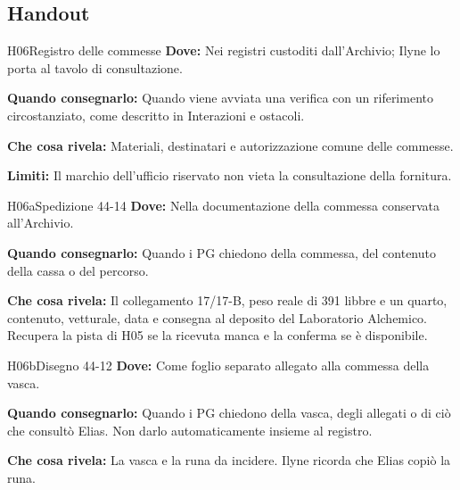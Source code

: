 \documentclass[11pt,a4paper]{article}
\begin{document}
\subsection{Handout}
\label{nodo-3-handout}
{}
\begin{handoutbox}{H06}{Registro delle commesse}
\textbf{Dove:} Nei registri custoditi dall'Archivio; Ilyne lo porta al tavolo di consultazione.

\textbf{Quando consegnarlo:} Quando viene avviata una verifica con un riferimento circostanziato, come descritto in Interazioni e ostacoli.

\textbf{Che cosa rivela:} Materiali, destinatari e autorizzazione comune delle commesse.

\textbf{Limiti:} Il marchio dell'ufficio riservato non vieta la consultazione della fornitura.
\end{handoutbox}

{}
\begin{handoutbox}{H06a}{Spedizione 44-14}
\textbf{Dove:} Nella documentazione della commessa conservata all'Archivio.

\textbf{Quando consegnarlo:} Quando i PG chiedono della commessa, del contenuto della cassa o del percorso.

\textbf{Che cosa rivela:} Il collegamento 17/17-B, peso reale di 391 libbre e un quarto, contenuto, vetturale, data e consegna al deposito del Laboratorio Alchemico. Recupera la pista di H05 se la ricevuta manca e la conferma se è disponibile.
\end{handoutbox}

{}
\begin{handoutbox}{H06b}{Disegno 44-12}
\textbf{Dove:} Come foglio separato allegato alla commessa della vasca.

\textbf{Quando consegnarlo:} Quando i PG chiedono della vasca, degli allegati o di ciò che consultò Elias. Non darlo automaticamente insieme al registro.

\textbf{Che cosa rivela:} La vasca e la runa da incidere. Ilyne ricorda che Elias copiò la runa.
\end{handoutbox}
\end{document}
